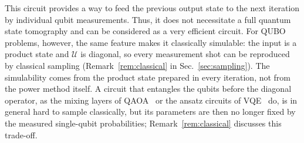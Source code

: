 \documentclass[onecolumn,10pt]{article}
\theoremstyle{remark}
\theoremstyle{plain}
\begin{document}
This circuit provides a way to feed the previous output state to the next iteration by individual qubit measurements. Thus, it does not necessitate a full quantum state tomography and can be considered as a very efficient circuit. For QUBO problems, however, the same feature makes it classically simulable: the input is a product state and $\mathcal{U}$ is diagonal, so every measurement shot can be reproduced by classical sampling (Remark~\ref{rem:classical} in Sec.~\ref{sec:sampling}). The simulability comes from the product state prepared in every iteration, not from the power method itself. A circuit that entangles the qubits before the diagonal operator, as the mixing layers of QAOA~\cite{farhi2014quantum} or the ansatz circuits of VQE~\cite{peruzzo2014variational} do, is in general hard to sample classically, but its parameters are then no longer fixed by the measured single-qubit probabilities; Remark~\ref{rem:classical} discusses this trade-off.
\end{document}
